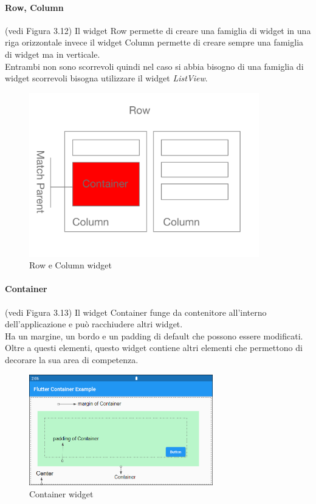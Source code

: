 \paragraph{Row, Column} (vedi Figura 3.12)
Il widget Row permette di creare una famiglia di widget in una riga orizzontale invece il widget Column permette di creare sempre una famiglia di widget ma in verticale.\\
Entrambi non sono scorrevoli quindi nel caso si abbia bisogno di una famiglia di widget scorrevoli bisogna utilizzare il widget \textit{ListView}.
\begin{figure}[htbp]	
	\centering
	\includegraphics[width=10cm]{immagini/rowcolumn.png}
	\caption{Row e Column widget}
	\label{fig:Row e Column widget}
\end{figure}

\newpage

\paragraph{Container} (vedi Figura 3.13)
Il widget Container funge da contenitore all'interno dell'applicazione e può racchiudere altri widget.\\
Ha un margine, un bordo e un padding di default che possono essere modificati.\\
Oltre a questi elementi, questo widget contiene altri elementi che permettono di decorare la sua area di competenza.
\begin{figure}[htbp]	
	\centering
	\includegraphics[width=8cm]{immagini/container.png}
	\caption{Container widget}
	\label{fig:Container widget}
\end{figure}

